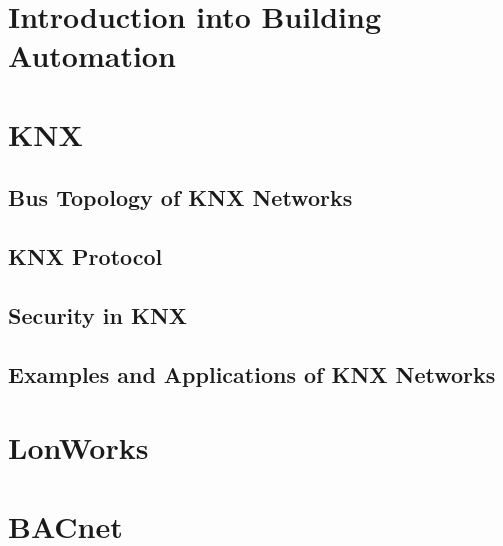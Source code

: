 
\section{Introduction into Building Automation}

\section{KNX}
	\subsection{Bus Topology of KNX Networks}
	\subsection{KNX Protocol}
	\subsection{Security in KNX}
	\subsection{Examples and Applications of KNX Networks}

\section{LonWorks}

\section{BACnet}